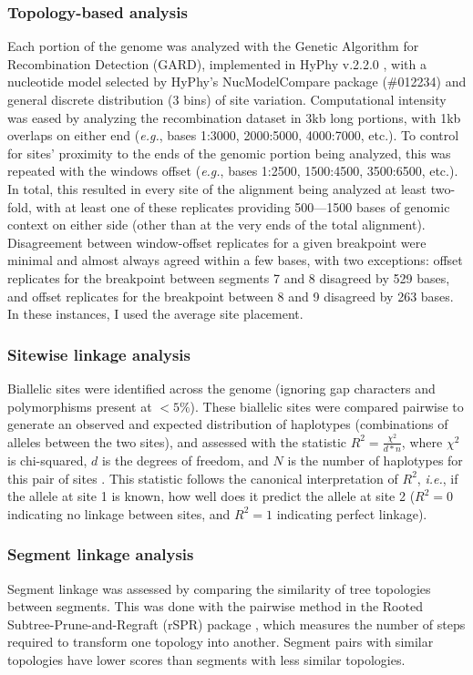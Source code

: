 \subsubsection*{Topology-based analysis}
Each portion of the genome was analyzed with the Genetic Algorithm for Recombination Detection (GARD), implemented in HyPhy v.2.2.0 \citep{kosakovsky2006gard}, with a nucleotide model selected by HyPhy’s NucModelCompare package (\#012234) and general discrete distribution (3 bins) of site variation.
Computational intensity was eased by analyzing the recombination dataset in 3kb long portions, with 1kb overlaps on either end (\textit{e.g.}, bases 1:3000, 2000:5000, 4000:7000, etc.).
To control for sites' proximity to the ends of the genomic portion being analyzed, this was repeated with the windows offset (\textit{e.g.}, bases 1:2500, 1500:4500, 3500:6500, etc.).
In total, this resulted in every site of the alignment being analyzed at least two-fold, with at least one of these replicates providing 500---1500 bases of genomic context on either side (other than at the very ends of the total alignment).
Disagreement between window-offset replicates for a given breakpoint were minimal and almost always agreed within a few bases, with two exceptions: offset replicates for the breakpoint between segments 7 and 8 disagreed by 529 bases, and offset replicates for the breakpoint between 8 and 9 disagreed by 263 bases.
In these instances, I used the average site placement.

\subsubsection*{Sitewise linkage analysis}
Biallelic sites were identified across the genome (ignoring gap characters and polymorphisms present at $<5\%$).
These biallelic sites were compared pairwise to generate an observed and expected distribution of haplotypes (combinations of alleles between the two sites), and assessed with the statistic $R^2=\frac{\chi^2}{d*n}$, where $\chi^2$ is chi-squared, $d$ is the degrees of freedom, and $N$ is the number of haplotypes for this pair of sites \citep{hill1968linkage}.
This statistic follows the canonical interpretation of $R^2$, \textit{i.e.}, if the allele at site 1 is known, how well does it predict the allele at site 2 ($R^2 = 0$ indicating no linkage between sites, and $R^2 = 1$ indicating perfect linkage).

\subsubsection*{Segment linkage analysis}
Segment linkage was assessed by comparing the similarity of tree topologies between segments.
This was done with the pairwise method in the Rooted Subtree-Prune-and-Regraft (rSPR) package \citep{whidden2017ricci}, which measures the number of steps required to transform one topology into another.
Segment pairs with similar topologies have lower scores than segments with less similar topologies.

